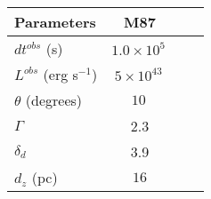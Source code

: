 \documentclass[preprint, twocolumn,secnumarabic,amssymb, nobibnotes, aps, prd]{revtex4-1}
\begin{document}
\begin{center}\renewcommand{\arraystretch}{0.75}\addtolength{\tabcolsep}{-1pt}
\begin{tabular}{ l c c c }
 \hline
 


\hline
\hline
\normalsize{Parameters} & \normalsize{M87}  \\
\hline
\hline

\scriptsize{$dt^{obs}$ (s)} &  \scriptsize{$1.0 \times 10^{5}\,$}    \\
 \scriptsize{$L^{obs}$ (erg s$^{-1}$) } & \scriptsize{$5 \times 10^{43}\,$}  \\ 
\scriptsize{ $\theta$ (degrees)} & \scriptsize{$10\,$}    \\
\scriptsize{$\Gamma$} &  \scriptsize{2.3}    \\
\scriptsize{$\delta_{d}$} &  \scriptsize{3.9} \\
\scriptsize{$d_z$ (pc)} &\scriptsize{$16$} \\








\end{tabular}
\end{center}
\end{document}
